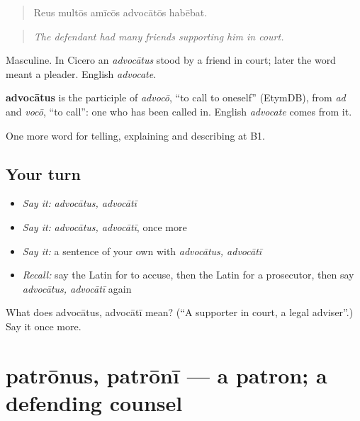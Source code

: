 \begin{quote}
Reus multōs amīcōs advocātōs habēbat.
\end{quote}

\begin{quote}
\emph{The defendant had many friends supporting him in court.}
\end{quote}

Masculine. In Cicero an \emph{advocātus} stood by a friend in court; later the word meant a pleader. English \emph{advocate}.

\begin{cousinweb}
\textbf{advocātus} is the participle of \emph{advocō}, \textquotedblleft{}to call to oneself\textquotedblright{} (EtymDB), from \emph{ad} and \emph{vocō}, \textquotedblleft{}to call\textquotedblright{}: one who has been called in. English \emph{advocate} comes from it.
\end{cousinweb}

\begin{grammarlens}[title={What you've built}]
One more word for telling, explaining and describing at B1.
\end{grammarlens}

\subsection*{Your turn}
\begin{itemize}
\raggedright
  \item \emph{Say it:} \emph{advocātus, advocātī}
  \item \emph{Say it:} \emph{advocātus, advocātī}, once more
  \item \emph{Say it:} a sentence of your own with \emph{advocātus, advocātī}
  \item \emph{Recall:} say the Latin for to accuse, then the Latin for a prosecutor, then say \emph{advocātus, advocātī} again
\end{itemize}

\begin{tcolorbox}[breakable,colback=teal!4,colframe=teal!35!black,title={Before you move on}]
What does advocātus, advocātī mean? (\textquotedblleft{}A supporter in court, a legal adviser\textquotedblright{}.) Say it once more.
\end{tcolorbox}
\section[patrōnus, patrōnī]{patrōnus, patrōnī — a patron; a defending counsel}

